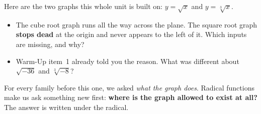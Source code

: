 \documentclass[10pt]{article}
\newcommand{\lgrid}[4]{%
  \draw[step=1, linegray!40, very thin] (#1,#3) grid (#2,#4);
  \draw[->, semithick, charcoal] (#1,0)--(#2,0) node[below right, font=\scriptsize]{$x$};
  \draw[->, semithick, charcoal] (0,#3)--(0,#4) node[left, font=\scriptsize]{$y$};}
\newcommand{\cbrtpos}[2]{\draw[very thick, forest, domain=#1:#2, samples=70, smooth]
  plot (\x,{pow(\x,1/3)});}
\newcommand{\cbrtneg}[2]{\draw[very thick, forest, domain=#1:#2, samples=70, smooth]
  plot (\x,{-pow(-1*(\x),1/3)});}
\begin{document}
\begin{hookbox}
Here are the two graphs this whole unit is built on: $y=\sqrt{x}$ and $y=\sqrt[3]{x}$.
\begin{center}
\end{center}
\begin{itemize}\setlength{\itemsep}{1pt}
  \item The cube root graph runs all the way across the plane. The square root graph \textbf{stops dead} at the origin and never appears to the left of it. Which inputs are missing, and why? \writeline
  \item Warm-Up item~1 already told you the reason. What was different about $\sqrt{-36}$ and $\sqrt[3]{-8}$? \writeline
\end{itemize}
For every family before this one, we asked \emph{what the graph does}. Radical functions make us ask
something new first: \textbf{where is the graph allowed to exist at all?} The answer is written under
the radical.
\end{hookbox}
\end{document}
